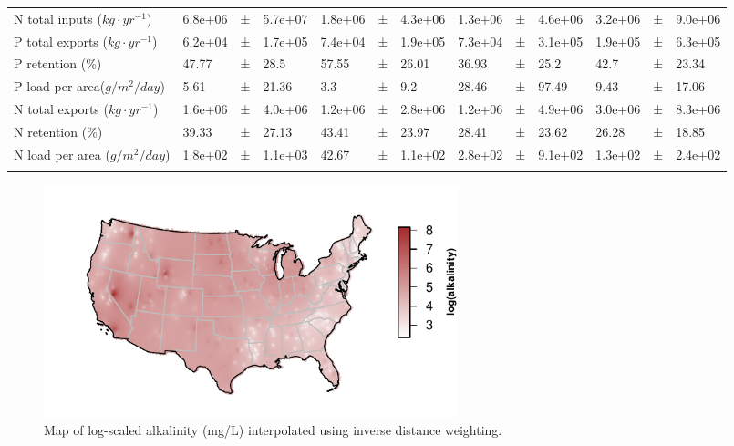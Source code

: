 \documentclass[journal abbreviations, manuscript]{copernicus}
\begin{document}
\begin{table}[t]
\begin{tabular}{lllllllllllll}
N total inputs ($kg \cdot yr^{-1}$) & 6.8e+06 & ± & 5.7e+07 & 1.8e+06 & ± & 4.3e+06 & 1.3e+06 & ± & 4.6e+06 & 3.2e+06 & ± & 9.0e+06\\

P total exports ($kg \cdot yr^{-1}$) & 6.2e+04 & ± & 1.7e+05 & 7.4e+04 & ± & 1.9e+05 & 7.3e+04 & ± & 3.1e+05 & 1.9e+05 & ± & 6.3e+05\\

P retention (\%) & 47.77 & ± & 28.5 & 57.55 & ± & 26.01 & 36.93 & ± & 25.2 & 42.7 & ± & 23.34\\

P load per area($g / m^{2} / day$) & 5.61 & ± & 21.36 & 3.3 & ± & 9.2 & 28.46 & ± & 97.49 & 9.43 & ± & 17.06\\

N total exports ($kg \cdot yr^{-1}$) & 1.6e+06 & ± & 4.0e+06 & 1.2e+06 & ± & 2.8e+06 & 1.2e+06 & ± & 4.9e+06 & 3.0e+06 & ± & 8.3e+06\\

N retention (\%) & 39.33 & ± & 27.13 & 43.41 & ± & 23.97 & 28.41 & ± & 23.62 & 26.28 & ± & 18.85\\

N load per area ($g / m^{2} / day$) & 1.8e+02 & ± & 1.1e+03 & 42.67 & ± & 1.1e+02 & 2.8e+02 & ± & 9.1e+02 & 1.3e+02 & ± & 2.4e+02\\
\bottomhline
\end{tabular}
\end{table}

\begin{figure}[t]
  \includegraphics[width=12cm]{alkalinity-crop.pdf}
  \caption{Map of log-scaled alkalinity (mg/L) interpolated using inverse distance weighting.}\label{fig:alkalinity}
\end{figure}
\end{document}
